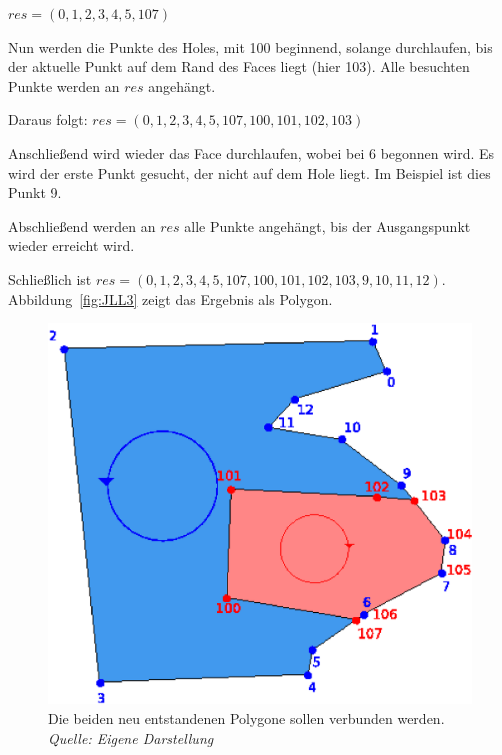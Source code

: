 $res=(0, 1, 2, 3, 4, 5, 107)$

Nun werden die Punkte des Holes,  mit 100 beginnend, solange durchlaufen, bis der aktuelle Punkt auf dem Rand des Faces liegt (hier 103). Alle besuchten Punkte werden an $res$ angehängt.

Daraus folgt: $res=(0, 1, 2, 3, 4, 5, 107, 100, 101, 102, 103)$

Anschließend wird wieder das Face durchlaufen, wobei bei 6 begonnen wird. Es wird  der erste Punkt  gesucht, der nicht auf dem Hole liegt. Im Beispiel ist dies Punkt 9.

Abschließend werden an $res$ alle Punkte angehängt, bis der Ausgangspunkt wieder erreicht wird.

Schließlich ist $res=(0, 1, 2, 3, 4, 5, 107, 100, 101, 102, 103, 9, 10, 11, 12)$. Abbildung~\vref{fig:JLL3} zeigt das Ergebnis als Polygon.


\begin{figure}
	\centering
	\includegraphics[width=0.5 \textwidth]{JLL2.svg.eps}
	\caption[Verbindung zweier Polygone] {Die beiden neu entstandenen Polygone sollen verbunden werden.\\\textit{Quelle: Eigene Darstellung}}
	\label{fig:JLL2}
\end{figure}



